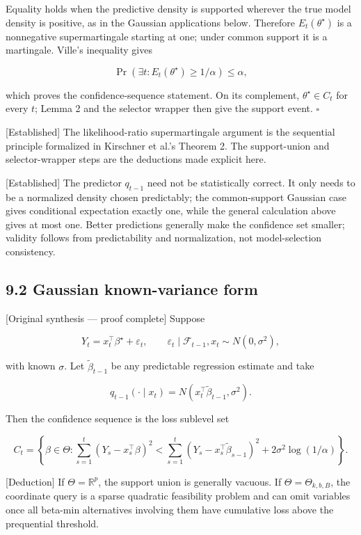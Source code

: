 \documentclass[
  english,
  11pt,
  a4paper,
]{article}
\begin{document}
Equality holds when the predictive density is supported wherever the
true model density is positive, as in the Gaussian applications below.
Therefore $E_t(\theta^\star)$ is a nonnegative supermartingale
starting at one; under common support it is a martingale. Ville's
inequality gives

$$
\Pr\left(\exists t:E_t(\theta^\star)\ge1/\alpha\right)\le\alpha,
$$

which proves the confidence-sequence statement. On its complement,
$\theta^\star\in C_t$ for every $t$; Lemma 2 and the selector
wrapper then give the support event. $\square$

{[}Established{]} The likelihood-ratio supermartingale argument is the
sequential principle formalized in Kirschner et al.'s Theorem 2. The
support-union and selector-wrapper steps are the deductions made
explicit here.

{[}Established{]} The predictor $q_{t-1}$ need not be statistically
correct. It only needs to be a normalized density chosen predictably;
the common-support Gaussian case gives conditional expectation exactly
one, while the general calculation above gives at most one. Better
predictions generally make the confidence set smaller; validity follows
from predictability and normalization, not model-selection consistency.

\subsection{9.2 Gaussian known-variance
form}\label{gaussian-known-variance-form}

{[}Original synthesis --- proof complete{]} Suppose

$$
Y_t=x_t^\top\beta^\star+\varepsilon_t,
\qquad
\varepsilon_t\mid\mathcal F_{t-1},x_t\sim N(0,\sigma^2),
$$

with known $\sigma$. Let $\widetilde\beta_{t-1}$ be any predictable
regression estimate and take

$$
q_{t-1}(\cdot\mid x_t)
=N(x_t^\top\widetilde\beta_{t-1},\sigma^2).
$$

Then the confidence sequence is the loss sublevel set

$$
C_t=
\left\{\beta\in\Theta:
\sum_{s=1}^t(Y_s-x_s^\top\beta)^2
<
\sum_{s=1}^t(Y_s-x_s^\top\widetilde\beta_{s-1})^2
+2\sigma^2\log(1/\alpha)
\right\}.
$$

{[}Deduction{]} If $\Theta=\mathbb R^p$, the support union is
generally vacuous. If $\Theta=\Theta_{k,b,B}$, the coordinate query is
a sparse quadratic feasibility problem and can omit variables once all
beta-min alternatives involving them have cumulative loss above the
prequential threshold.
\end{document}
